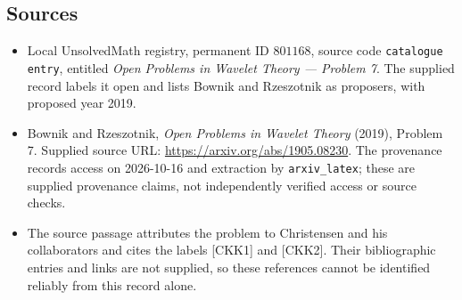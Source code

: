 \documentclass[11pt]{article}
\begin{document}
\subsection{Sources}
\begin{itemize}
\item Local UnsolvedMath registry, permanent ID \(801168\), source code \texttt{catalogue entry}, entitled \emph{Open Problems in Wavelet Theory --- Problem 7}. The supplied record labels it open and lists Bownik and Rzeszotnik as proposers, with proposed year 2019.
\item Bownik and Rzeszotnik, \emph{Open Problems in Wavelet Theory} (2019), Problem 7. Supplied source URL: \url{https://arxiv.org/abs/1905.08230}. The provenance records access on 2026-10-16 and extraction by \texttt{arxiv\_latex}; these are supplied provenance claims, not independently verified access or source checks.
\item The source passage attributes the problem to Christensen and his collaborators and cites the labels [CKK1] and [CKK2]. Their bibliographic entries and links are not supplied, so these references cannot be identified reliably from this record alone.
\end{itemize}
\end{document}
